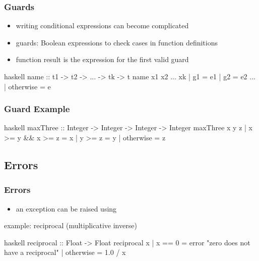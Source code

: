 \documentclass[dvipsnames]{beamer}
\theoremstyle{plain}
\begin{document}
\begin{frame}[fragile]
  \frametitle{Guards}

  \begin{itemize}
    \item writing conditional expressions can become complicated
    \item \alert{guards}: Boolean expressions to check cases
      in function definitions
    \item function result is the expression for the first valid guard
  \end{itemize}

  \begin{block}{}
    \begin{pygments}{haskell}
name :: t1 -> t2 -> ... -> tk -> t
name x1 x2 ... xk
  | g1        = e1
  | g2        = e2
    ...
  | otherwise = e
    \end{pygments}
  \end{block}
\end{frame}

\begin{frame}[fragile]
  \frametitle{Guard Example}

  \begin{exampleblock}{}
    \begin{pygments}{haskell}
maxThree :: Integer -> Integer -> Integer -> Integer
maxThree x y z
  | x >= y && x >= z = x
  | y >= z           = y
  | otherwise        = z
    \end{pygments}
  \end{exampleblock}
\end{frame}

\subsection{Errors}

\begin{frame}[fragile]
  \frametitle{Errors}

  \begin{itemize}
    \item an exception can be raised using 
  \end{itemize}

  \begin{exampleblock}{example: reciprocal (multiplicative inverse)}
    \begin{pygments}{haskell}
reciprocal :: Float -> Float
reciprocal x
  | x == 0    = error "zero does not have a reciprocal"
  | otherwise = 1.0 / x
    \end{pygments}
  \end{exampleblock}
\end{frame}
\end{document}

